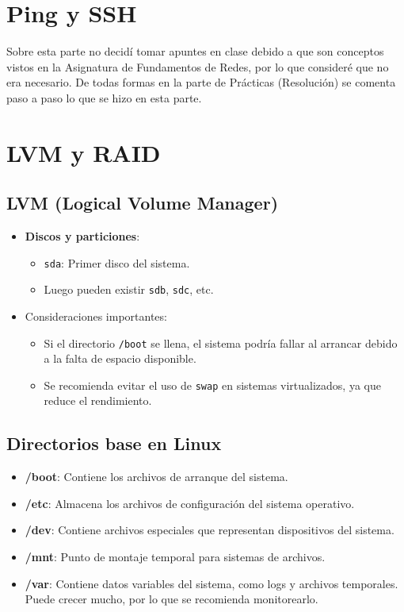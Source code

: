 \section{Ping y SSH}

Sobre esta parte no decidí tomar apuntes en clase debido a que son conceptos vistos en la Asignatura de Fundamentos de Redes, por lo que consideré que no era necesario. De todas formas en la parte de Prácticas (Resolución) se comenta paso a paso lo que se hizo en esta parte.

\section{LVM y RAID}

\subsection{LVM (Logical Volume Manager)}

\begin{itemize}
    \item \textbf{Discos y particiones}:
    \begin{itemize}
        \item \texttt{sda}: Primer disco del sistema.
        \item Luego pueden existir \texttt{sdb}, \texttt{sdc}, etc.
    \end{itemize}
    \item Consideraciones importantes:
    \begin{itemize}
        \item Si el directorio \texttt{/boot} se llena, el sistema podría fallar al arrancar debido a la falta de espacio disponible.
        \item Se recomienda evitar el uso de \texttt{swap} en sistemas virtualizados, ya que reduce el rendimiento.
    \end{itemize}
\end{itemize}

\subsection{Directorios base en Linux}
\begin{itemize}
    \item \textbf{/boot}: Contiene los archivos de arranque del sistema.
    \item \textbf{/etc}: Almacena los archivos de configuración del sistema operativo.
    \item \textbf{/dev}: Contiene archivos especiales que representan dispositivos del sistema.
    \item \textbf{/mnt}: Punto de montaje temporal para sistemas de archivos.
    \item \textbf{/var}: Contiene datos variables del sistema, como logs y archivos temporales. Puede crecer mucho, por lo que se recomienda monitorearlo.
\end{itemize}


